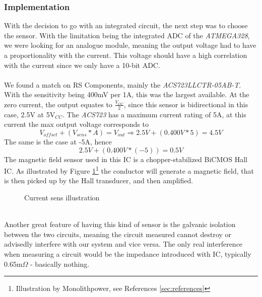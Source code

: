 \subsubsection{Implementation}
With the decision to go with an integrated circuit, the next step was to choose the sensor. With the limitation being the integrated ADC of the \textit{ATMEGA328}, we were looking for an analogue module, meaning the output voltage had to have a proportionality with the current. This voltage should have a high correlation with the current since we only have a 10-bit ADC.
\\ \\
We found a match on RS Components, mainly the \textit{ACS723LLCTR-05AB-T}. With the sensitivity being 400mV per 1A, this was the largest available. At the zero current, the output equates to $\frac{V_{CC}}{2}$, since this sensor is bidirectional in this case, 2.5V at 5V$_{CC}$. The \textit{ACS723} has a maximum current rating of 5A, at this current the max output voltage corresponds to 
\[V_{offset}+(V_{sens}*A)=V_{out}\Rightarrow2.5V+(0.400V*5)=4.5V\]
 The same is the case at -5A, hence 
\[2.5V+(0.400V*(-5))=0.5V\]
The magnetic field sensor used in this IC is a chopper-stabilized BiCMOS Hall IC. As illustrated by Figure \ref{fig:currentSens}\footnote{Illustration by Monolithpower, see References \ref{sec:references}} the conductor will generate a magnetic field, that is then picked up by the Hall transducer, and then amplified. 
\begin{figure}[h]
    \centering
    \caption{Current sens illustration}
    \label{fig:currentSens}
\end{figure}
\\
Another great feature of having this kind of sensor is the galvanic isolation between the two circuits, meaning the circuit measured cannot destroy or advisedly interfere with our system and vice versa. The only real interference when measuring a circuit would be the impedance introduced with IC, typically 0.65m$\Omega$ - basically nothing.

